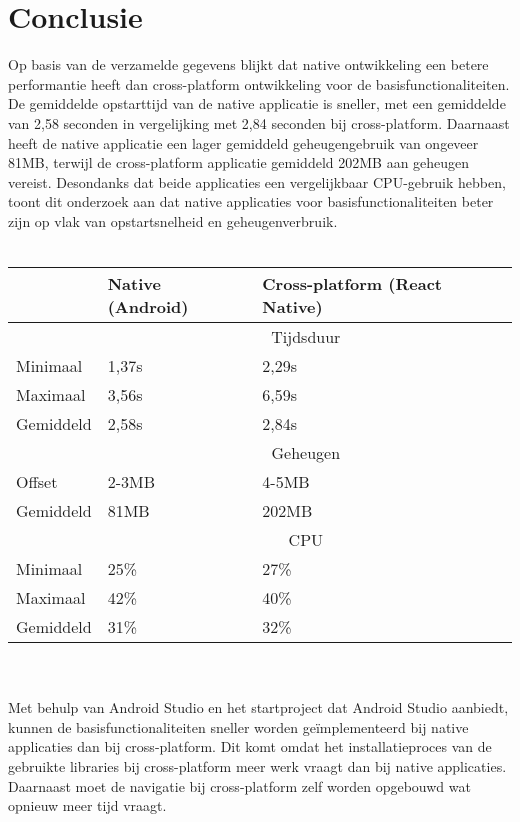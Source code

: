 \section{Conclusie}
Op basis van de verzamelde gegevens blijkt dat native ontwikkeling een betere
performantie heeft dan cross-platform ontwikkeling voor de basisfunctionaliteiten. De gemiddelde 
opstarttijd van de native applicatie is sneller, met een gemiddelde van 2,58 seconden 
in vergelijking met 2,84 seconden bij cross-platform. Daarnaast heeft de native 
applicatie een lager gemiddeld geheugengebruik van ongeveer 81MB, terwijl de cross-platform 
applicatie gemiddeld 202MB aan geheugen vereist. Desondanks dat beide applicaties een
vergelijkbaar CPU-gebruik hebben, toont dit onderzoek aan dat native applicaties voor
basisfunctionaliteiten beter zijn op vlak van opstartsnelheid en geheugenverbruik.
\\\\
\begin{tabular}{ |p{3cm}||p{5cm}|p{5cm}| }
    \hline
     & Native (Android) & Cross-platform (React Native) \\
    \hline
     & \multicolumn{2}{|c|}{Tijdsduur} \\
    \hline
    Minimaal & 1,37s & 2,29s \\
    Maximaal & 3,56s & 6,59s \\
    Gemiddeld & 2,58s & 2,84s \\
    \hline
     & \multicolumn{2}{|c|}{Geheugen} \\ 
    \hline
    Offset & 2-3MB & 4-5MB \\
    Gemiddeld & 81MB & 202MB \\
    \hline
     & \multicolumn{2}{|c|}{CPU} \\
    \hline
    Minimaal & 25\% & 27\% \\
    Maximaal & 42\% & 40\% \\
    Gemiddeld & 31\% & 32\% \\
    \hline
\end{tabular}
\\\\
Met behulp van Android Studio en het startproject dat Android Studio aanbiedt, 
kunnen de basisfunctionaliteiten sneller worden geïmplementeerd bij 
native applicaties dan bij cross-platform. Dit komt omdat het installatieproces van 
de gebruikte libraries bij cross-platform meer werk vraagt dan bij native applicaties. 
Daarnaast moet de navigatie bij cross-platform zelf worden opgebouwd wat opnieuw meer tijd vraagt.
\\\\
